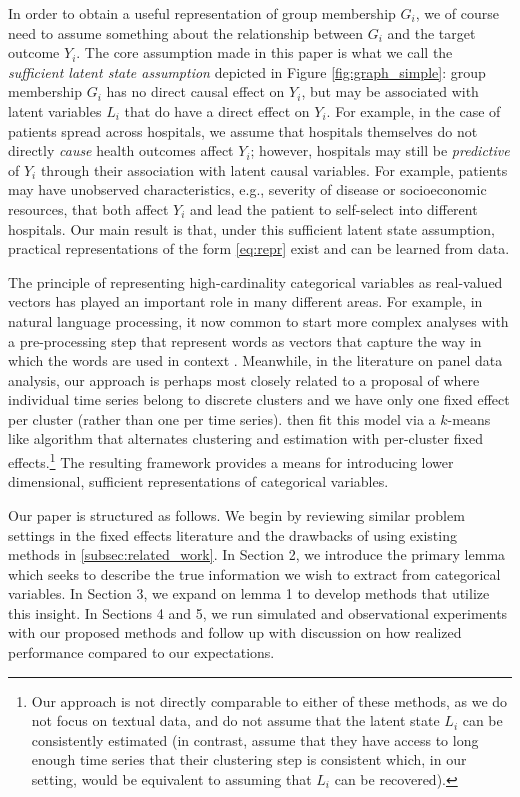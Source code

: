 \documentclass{article}
\theoremstyle{plain}
\theoremstyle{definition}
\theoremstyle{remark}
\begin{document}
In order to obtain a useful representation of group membership $G_i$, we of course need to assume
something about the relationship between $G_i$ and the target outcome $Y_i$. The core assumption
made in this paper is what we call the \emph{sufficient latent state assumption} depicted in Figure
\ref{fig:graph_simple}: group membership $G_i$ has no direct causal effect on $Y_i$, but may be
associated with latent variables $L_i$ that do have a direct effect on $Y_i$.
For example, in the case of patients spread across hospitals, we assume that hospitals themselves do not
directly \emph{cause} health outcomes affect $Y_i$; however, hospitals may still be \emph{predictive} of
$Y_i$ through their association with latent causal variables. For example, patients may have unobserved
characteristics, e.g., severity of disease or socioeconomic resources, that both affect $Y_i$ and lead the
patient to self-select into different hospitals. Our main result is that, under this sufficient latent state
assumption, practical representations of the form \eqref{eq:repr} exist and can be learned from data.

The principle of representing high-cardinality categorical variables as real-valued vectors has played
an important role in many different areas. For example, in natural language processing, it now common
to start more complex analyses with a pre-processing step that represent words as vectors that capture
the way in which the words are used in context \citep{mikolov2013efficient,pennington2014glove}.
Meanwhile, in the literature on panel data analysis, our approach is perhaps most closely related
to a proposal of \citet{bonhomme2015grouped} where individual time series belong to discrete clusters and we
have only one fixed effect per cluster (rather than one per time series). \citet{bonhomme2015grouped} then fit
this model via a $k$-means like algorithm that alternates clustering and estimation with per-cluster fixed
effects.\footnote{Our approach is not directly comparable to either of these methods, as we do not focus on
textual data, and do not assume that the latent state $L_i$ can be consistently estimated (in contrast,
\citet{bonhomme2015grouped} assume that they have access to long enough time series that their
clustering step is consistent which, in our setting, would be equivalent to assuming that $L_i$ can be recovered).} The resulting framework provides a means for introducing lower dimensional, sufficient representations of categorical variables.


Our paper is structured as follows. We begin by reviewing similar problem settings in the fixed effects literature and the drawbacks of using existing methods in \ref{subsec:related_work}. In Section 2, we introduce the primary lemma which seeks to describe the true information we wish to extract from categorical variables. In Section 3, we expand on lemma 1 to develop methods that utilize this insight. In Sections 4 and 5, we run simulated and observational experiments with our proposed methods and follow up with discussion on how realized performance compared to our expectations.
\end{document}
